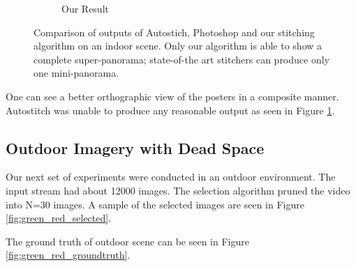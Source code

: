\begin{figure}
\begin{subfigure}[b]{\textwidth}
\caption{Our Result}
\end{subfigure}
\caption{Comparison of outputs of Autostich, Photoshop and our stitching
algorithm on an indoor scene. Only our
algorithm is able to show a complete super-panorama; state-of-the art
stitchers can produce only one mini-panorama.}
\label{fig:idc_indoor_comparison}
\end{figure}

One can see a better orthographic view of the posters in a composite
manner. Autostitch was unable to produce any reasonable output as seen in
Figure \ref{fig:idc_indoor_comparison}.

\subsection{Outdoor Imagery with Dead Space}
Our next set of experiments were conducted in an outdoor environment. The  
input stream had about 12000 images. The selection algorithm pruned the video
into N=30 images. A sample of the selected images are seen in Figure
\ref{fig:green_red_selected}.

The ground truth of outdoor scene can be seen in Figure
\ref{fig:green_red_groundtruth}.

